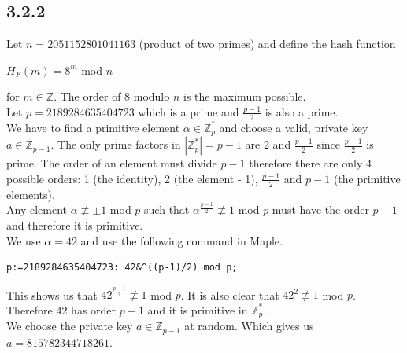 \documentclass[11pt]{report}
\begin{document}
\subsection*{3.2.2}
Let $n = 2051152801041163$ (product of two primes) and define the hash function
\begin{center}
$H_F(m) = 8^m$ mod $n$
\end{center}
for $m \in \mathbb{Z}$. The order of 8 modulo $n$ is the maximum possible.\\
Let $p = 2189284635404723$ which is a prime and $\frac{p-1}{2}$ is also a prime.\\
We have to find a primitive element $\alpha \in \mathbb{Z}^*_p$ and choose a valid, private key $a \in \mathbb{Z}_{p-1}$.
The only prime factors in $|\mathbb{Z}^*_p| = p - 1$ are 2 and $\frac{p-1}{2}$ since $\frac{p-1}{2}$ is prime. The order of an element must divide $p - 1$ therefore there are only 4 possible orders: 1 (the identity), 2 (the element - 1), $\frac{p-1}{2}$ and $p - 1$ (the primitive elements).\\
Any element $\alpha \not\equiv \pm 1$ mod $p$ such that $\alpha^{\frac{p-1}{2}} \not\equiv 1$ mod $p$ must have the order $p - 1$ and therefore it is primitive.\\
We use $\alpha = 42$ and use the following command in Maple.
\begin{lstlisting}[style=Maple]
p:=2189284635404723: 42&^((p-1)/2) mod p;
\end{lstlisting}
This shows us that $42^{\frac{p-1}{2}} \not\equiv 1$ mod $p$. It is also clear that $42^2 \not\equiv 1$ mod $p$. Therefore 42 has order $p - 1$ and it is primitive in $\mathbb{Z}^*_p$.\\
We choose the private key $a \in \mathbb{Z}_{p-1}$ at random. Which gives us $a = 815782344718261$.
\end{document}
